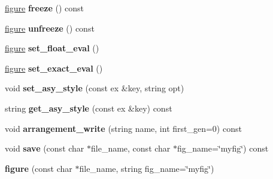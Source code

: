 \begin{DoxyCompactItemize}
\item 
\mbox{\label{class_moeb_inv_1_1figure_a02bf77ec6aad9df7729cb0cbcd13cc86}} 
\mbox{\hyperlink{class_moeb_inv_1_1figure}{figure}} {\bfseries freeze} () const
\item 
\mbox{\label{class_moeb_inv_1_1figure_a710ef7010d067dbb9236982721f77aa3}} 
\mbox{\hyperlink{class_moeb_inv_1_1figure}{figure}} {\bfseries unfreeze} () const
\item 
\mbox{\label{class_moeb_inv_1_1figure_acb91de7431b221e254dc346d674bf8ee}} 
\mbox{\hyperlink{class_moeb_inv_1_1figure}{figure}} {\bfseries set\+\_\+float\+\_\+eval} ()
\item 
\mbox{\label{class_moeb_inv_1_1figure_abbabd3387426db22e8b91ada8aee1f5f}} 
\mbox{\hyperlink{class_moeb_inv_1_1figure}{figure}} {\bfseries set\+\_\+exact\+\_\+eval} ()
\item 
\mbox{\label{class_moeb_inv_1_1figure_a0d9d0212994fd3003ba7f770fd0971e3}} 
void {\bfseries set\+\_\+asy\+\_\+style} (const ex \&key, string opt)
\item 
\mbox{\label{class_moeb_inv_1_1figure_ac59852184f352895f3398f6c82fdc799}} 
string {\bfseries get\+\_\+asy\+\_\+style} (const ex \&key) const
\item 
\mbox{\label{class_moeb_inv_1_1figure_aedaad1298de3ef67d89f1526df799b2c}} 
void {\bfseries arrangement\+\_\+write} (string name, int first\+\_\+gen=0) const
\item 
\mbox{\label{class_moeb_inv_1_1figure_afabc986665580bfeefee5cffca95a6c3}} 
void {\bfseries save} (const char $\ast$file\+\_\+name, const char $\ast$fig\+\_\+name=\char`\"{}myfig\char`\"{}) const
\item 
\mbox{\label{class_moeb_inv_1_1figure_ae920a70e851e5d384334717dda4a2c9f}} 
{\bfseries figure} (const char $\ast$file\+\_\+name, string fig\+\_\+name=\char`\"{}myfig\char`\"{})
\item 
\mbox{\label{class_moeb_inv_1_1figure_a32747e3cf3b9924e3d5cd26581d06eb7}} 

\end{DoxyCompactItemize}
